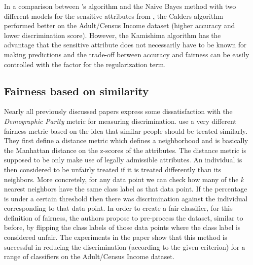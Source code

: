 In a comparison between \citet{kamishima2011fairness}'s algorithm
and the Naive Bayes method with two different models for the sensitive attributes
from \citet{calders2010three},
the Calders algorithm performed better on the Adult/Census Income dataset
(higher accuracy and lower discrimination score).
However, the Kamishima algorithm has the advantage
that the sensitive attribute does not necessarily have to be known for making predictions
and the trade-off between accuracy and fairness can be easily controlled
with the factor for the regularization term.

\subsection{Fairness based on similarity}%
\label{fairness-based-on-similarity}
Nearly all previously discussed papers express some dissatisfaction
with the \emph{Demographic Parity} metric for measuring discrimination.
\citet{luong2011k} use a very different fairness metric
based on the idea that similar people should be treated similarly.
They first define a distance metric which defines a neighborhood
and is basically the Manhattan distance on the z-scores of the attributes.
The distance metric is supposed to be only make use of legally admissible attributes.
An individual is then considered to be unfairly treated
if it is treated differently than its neighbors.
More concretely, for any data point we can check
how many of the \(k\) nearest neighbors have the same class label as that data point.
If the percentage is under a certain threshold
then there was discrimination against the individual corresponding to that data point.
In order to create a fair classifier, for this definition of fairness,
the authors propose to pre-process the dataset,
similar to \citet{kamiran2009classifying} before,
by flipping the class labels of those data points where the class label is considered unfair.
The experiments in the paper show that this method is successful in reducing the discrimination
(according to the given criterion)
for a range of classifiers on the Adult/Census Income dataset.

